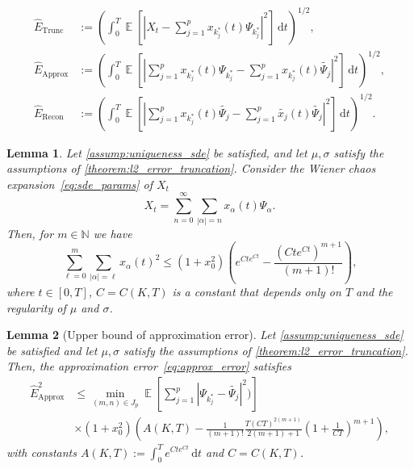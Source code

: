 \documentclass[10pt,a4paper]{amsart}
\newtheorem{lemma}{Lemma}
\DeclareMathOperator{\E}{\mathbb E}
\newcommand{\dd}{\ensuremath{\,\mathrm d}}
\begin{document}
    \begin{align}
        \hat E_\text{Trunc} &:= \left(\int_0^T \E[|X_t - \sum_{j=1}^p x_{k_j^*}(t)\Psi_{k_j^*}|^2]\dd t\right)^{1/2},\label{eq:trunc_error}\\
        \hat E_\text{Approx} &:= \left(\int_0^T \E[|\sum_{j=1}^p x_{k_j^*}(t)\Psi_{k_j^*} - \sum_{j=1}^p x_{k_j^*}(t)\widetilde{\Psi_j}|^2]\dd t\right)^{1/2},\label{eq:approx_error}\\
        \hat E_\text{Recon} &:= \left(\int_0^T \E[|\sum_{j=1}^p x_{k_j^*}(t)\widetilde{\Psi_j} - \sum_{j=1}^p \widetilde{x_j}(t)\widetilde{\Psi_j}|^2]\dd t\right)^{1/2}.\label{eq:reconstruct_error}
    \end{align}

\begin{lemma}\label{lemma:decay_squared_coef}
    Let \cref{assump:uniqueness_sde} be satisfied, and let $\mu,\sigma$ satisfy the assumptions of \cref{theorem:l2_error_truncation}.
    Consider the Wiener chaos expansion~\cref{eq:sde_params} of $X_t$
    \begin{equation*}
        X_t = \sum_{n=0}^\infty \sum_{|\alpha|=n} x_\alpha(t) \Psi_\alpha.
    \end{equation*}
    Then, for $m \in \mathbb N$ we have
    \begin{equation*}
        \sum_{\ell = 0}^m \sum_{|\alpha|=\ell} x_\alpha(t)^2 \leq (1+x_0^2)\left(e^{Ct e^{Ct}} - \frac{(Cte^{Ct})^{m+1}}{(m+1)!}\right),
    \end{equation*}
    where $t \in [0, T]$, $C = C(K, T)$ is a constant that depends only on $T$ and the regularity of $\mu$ and $\sigma$.
\end{lemma}

\begin{lemma}[{Upper bound of approximation error}]\label{lemma:ub_approx_error}
    Let \cref{assump:uniqueness_sde} be satisfied and let $\mu,\sigma$ satisfy the assumptions of \cref{theorem:l2_error_truncation}.
    Then, the \emph{approximation error}~\cref{eq:approx_error} satisfies
    \begin{align*}
        \hat E_\text{Approx}^2 &\leq \min_{(m,n) \in J_p} \E\left[\sum_{j=1}^p |\Psi_{k_j^*}-\widetilde{\Psi_j}|^2)\right]\\ &\times (1+x_0^2)\left(A(K,T) - \frac{1}{(m+1)!}\frac{T(CT)^{2(m+1)}}{2(m+1)+1}\left(1+\frac{1}{CT}\right)^{m+1}\right),
    \end{align*}
    with constants $A(K,T):=\int_0^T e^{Cte^{Ct}} \dd t$ and $C=C(K,T)$.
\end{lemma}
\end{document}

